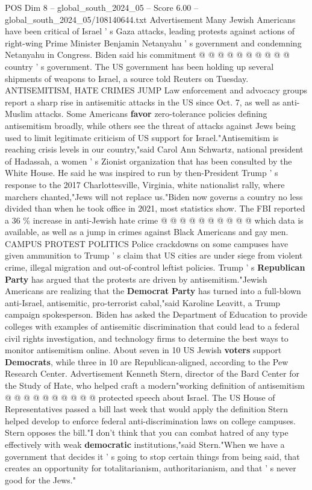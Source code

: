 \begin{textsample}{POS Dim 8 – global\_south\_2024\_05 – Score 6.00 – global\_south\_2024\_05/108140644.txt}
Advertisement Many Jewish Americans have been critical of Israel ' s Gaza attacks, leading protests against actions of right-wing Prime Minister Benjamin Netanyahu ' s government and condemning Netanyahu in Congress.
Biden said his commitment @ @ @ @ @ @ @ @ @ @ country ' s government.
The US government has been holding up several shipments of weapons to Israel, a source told Reuters on Tuesday.
ANTISEMITISM, HATE CRIMES JUMP Law enforcement and advocacy groups report a sharp rise in antisemitic attacks in the US since Oct. 7, as well as anti-Muslim attacks.
Some Americans \textbf{favor} zero-tolerance policies defining antisemitism broadly, while others see the threat of attacks against Jews being used to limit legitimate criticism of US support for Israel."Antisemitism is reaching crisis levels in our country,"said Carol Ann Schwartz, national president of Hadassah, a women ' s Zionist organization that has been consulted by the White House.
He said he was inspired to run by then-President Trump ' s response to the 2017 Charlottesville, Virginia, white nationalist rally, where marchers chanted,"Jews will not replace us."Biden now governs a country no less divided than when he took office in 2021, most statistics show.
The FBI reported a 36 \% increase in anti-Jewish hate crime @ @ @ @ @ @ @ @ @ @ which data is available, as well as a jump in crimes against Black Americans and gay men.
CAMPUS PROTEST POLITICS Police crackdowns on some campuses have given ammunition to Trump ' s claim that US cities are under siege from violent crime, illegal migration and out-of-control leftist policies.
Trump ' s \textbf{Republican} \textbf{Party} has argued that the protests are driven by antisemitism."Jewish Americans are realizing that the \textbf{Democrat} \textbf{Party} has turned into a full-blown anti-Israel, antisemitic, pro-terrorist cabal,"said Karoline Leavitt, a Trump campaign spokesperson.
Biden has asked the Department of Education to provide colleges with examples of antisemitic discrimination that could lead to a federal civil rights investigation, and technology firms to determine the best ways to monitor antisemitism online.
About seven in 10 US Jewish \textbf{voters} support \textbf{Democrats}, while three in 10 are Republican-aligned, according to the Pew Research Center.
Advertisement Kenneth Stern, director of the Bard Center for the Study of Hate, who helped craft a modern"working definition of antisemitism @ @ @ @ @ @ @ @ @ @ protected speech about Israel.
The US House of Representatives passed a bill last week that would apply the definition Stern helped develop to enforce federal anti-discrimination laws on college campuses.
Stern opposes the bill."I don't think that you can combat hatred of any type effectively with weak \textbf{democratic} institutions,"said Stern."When we have a government that decides it ' s going to stop certain things from being said, that creates an opportunity for totalitarianism, authoritarianism, and that ' s never good for the Jews."

\end{textsample}
